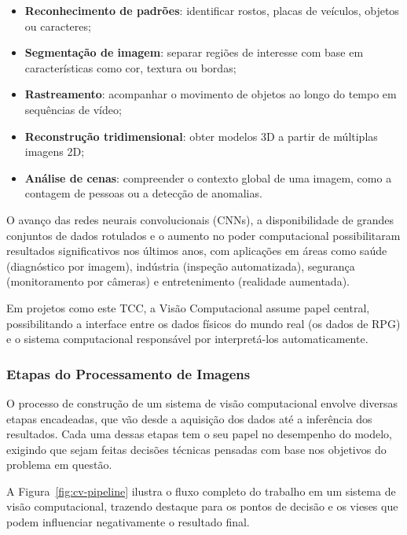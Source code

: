\begin{itemize}
\item \textbf{Reconhecimento de padrões}: identificar rostos, placas de veículos, objetos ou caracteres;
\item \textbf{Segmentação de imagem}: separar regiões de interesse com base em características como cor, 
textura ou bordas;
\item \textbf{Rastreamento}: acompanhar o movimento de objetos ao longo do tempo em sequências de vídeo;
\item \textbf{Reconstrução tridimensional}: obter modelos 3D a partir de múltiplas imagens 2D;
\item \textbf{Análise de cenas}: compreender o contexto global de uma imagem, como a contagem de 
pessoas ou a detecção de anomalias.
\end{itemize}

O avanço das redes neurais convolucionais (CNNs), a disponibilidade de grandes conjuntos de dados rotulados 
e o aumento no poder computacional possibilitaram resultados significativos nos últimos anos, com aplicações 
em áreas como saúde (diagnóstico por imagem), indústria (inspeção automatizada), segurança (monitoramento 
por câmeras) e entretenimento (realidade aumentada).

Em projetos como este TCC, a Visão Computacional assume papel central, possibilitando a interface entre os 
dados físicos do mundo real (os dados de RPG) e o sistema computacional responsável por interpretá-los automaticamente.



\subsubsection{Etapas do Processamento de Imagens}

O processo de construção de um sistema de visão computacional envolve diversas etapas encadeadas, que vão desde 
a aquisição dos dados até a inferência dos resultados. Cada uma dessas etapas tem o seu papel no desempenho do modelo, 
exigindo que sejam feitas decisões técnicas pensadas com base nos objetivos do problema em questão.

A Figura~\ref{fig:cv-pipeline} ilustra o fluxo completo do trabalho em um sistema de visão computacional, trazendo 
destaque para os pontos de decisão e os vieses que podem influenciar negativamente o resultado final.

